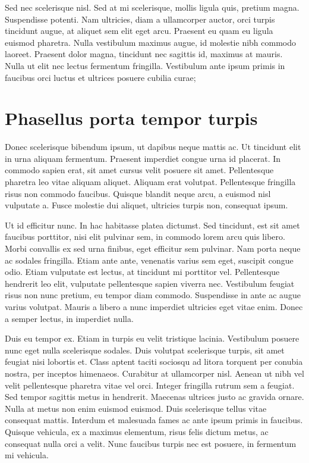 Sed nec scelerisque nisl. Sed at mi scelerisque, mollis ligula quis, pretium magna. Suspendisse potenti. Nam ultricies, diam a ullamcorper auctor, orci turpis tincidunt augue, at aliquet sem elit eget arcu. Praesent eu quam eu ligula euismod pharetra. Nulla vestibulum maximus augue, id molestie nibh commodo laoreet. Praesent dolor magna, tincidunt nec sagittis id, maximus at mauris. Nulla ut elit nec lectus fermentum fringilla. Vestibulum ante ipsum primis in faucibus orci luctus et ultrices posuere cubilia curae;

\section{Phasellus porta tempor turpis}
Donec scelerisque bibendum ipsum, ut dapibus neque mattis ac. Ut tincidunt elit in urna aliquam fermentum. Praesent imperdiet congue urna id placerat. In commodo sapien erat, sit amet cursus velit posuere sit amet. Pellentesque pharetra leo vitae aliquam aliquet. Aliquam erat volutpat. Pellentesque fringilla risus non commodo faucibus. Quisque blandit neque arcu, a euismod nisl vulputate a. Fusce molestie dui aliquet, ultricies turpis non, consequat ipsum.

Ut id efficitur nunc. In hac habitasse platea dictumst. Sed tincidunt, est sit amet faucibus porttitor, nisi elit pulvinar sem, in commodo lorem arcu quis libero. Morbi convallis ex sed urna finibus, eget efficitur sem pulvinar. Nam porta neque ac sodales fringilla. Etiam ante ante, venenatis varius sem eget, suscipit congue odio. Etiam vulputate est lectus, at tincidunt mi porttitor vel. Pellentesque hendrerit leo elit, vulputate pellentesque sapien viverra nec. Vestibulum feugiat risus non nunc pretium, eu tempor diam commodo. Suspendisse in ante ac augue varius volutpat. Mauris a libero a nunc imperdiet ultricies eget vitae enim. Donec a semper lectus, in imperdiet nulla.

Duis eu tempor ex. Etiam in turpis eu velit tristique lacinia. Vestibulum posuere nunc eget nulla scelerisque sodales. Duis volutpat scelerisque turpis, sit amet feugiat nisi lobortis et. Class aptent taciti sociosqu ad litora torquent per conubia nostra, per inceptos himenaeos. Curabitur at ullamcorper nisl. Aenean ut nibh vel velit pellentesque pharetra vitae vel orci. Integer fringilla rutrum sem a feugiat. Sed tempor sagittis metus in hendrerit. Maecenas ultrices justo ac gravida ornare. Nulla at metus non enim euismod euismod. Duis scelerisque tellus vitae consequat mattis. Interdum et malesuada fames ac ante ipsum primis in faucibus. Quisque vehicula, ex a maximus elementum, risus felis dictum metus, ac consequat nulla orci a velit. Nunc faucibus turpis nec est posuere, in fermentum mi vehicula.

